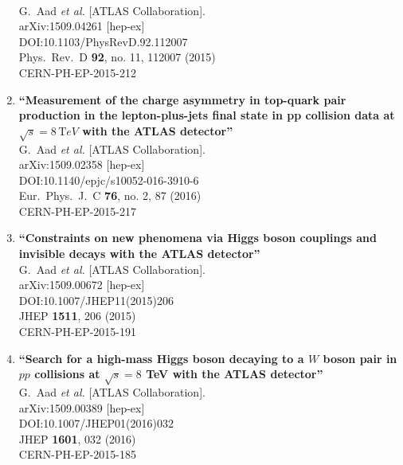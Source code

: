 \documentclass{article}
\begin{document}
\begin{enumerate}
  \\{}G.~Aad {\it et al.} [ATLAS Collaboration].
  \\{}arXiv:1509.04261 [hep-ex]
  \\{}DOI:10.1103/PhysRevD.92.112007
  \\{}Phys.\ Rev.\ D {\bf 92}, no. 11, 112007 (2015)
  \\{}CERN-PH-EP-2015-212
\item%
{\bf ``Measurement of the charge asymmetry in top-quark pair production in the lepton-plus-jets final state in pp collision data at $\sqrt{s}=8\,\mathrm TeV{}$ with the ATLAS detector''}
  \\{}G.~Aad {\it et al.} [ATLAS Collaboration].
  \\{}arXiv:1509.02358 [hep-ex]
  \\{}DOI:10.1140/epjc/s10052-016-3910-6
  \\{}Eur.\ Phys.\ J.\ C {\bf 76}, no. 2, 87 (2016)
  \\{}CERN-PH-EP-2015-217
\item%
{\bf ``Constraints on new phenomena via Higgs boson couplings and invisible decays with the ATLAS detector''}
  \\{}G.~Aad {\it et al.} [ATLAS Collaboration].
  \\{}arXiv:1509.00672 [hep-ex]
  \\{}DOI:10.1007/JHEP11(2015)206
  \\{}JHEP {\bf 1511}, 206 (2015)
  \\{}CERN-PH-EP-2015-191
\item%
{\bf ``Search for a high-mass Higgs boson decaying to a $W$ boson pair in $pp$ collisions at $\sqrt{s} = 8$ TeV with the ATLAS detector''}
  \\{}G.~Aad {\it et al.} [ATLAS Collaboration].
  \\{}arXiv:1509.00389 [hep-ex]
  \\{}DOI:10.1007/JHEP01(2016)032
  \\{}JHEP {\bf 1601}, 032 (2016)
  \\{}CERN-PH-EP-2015-185

\end{enumerate}
\end{document}

